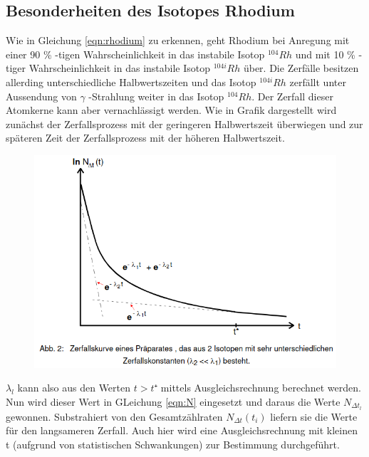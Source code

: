 \subsection{Besonderheiten des Isotopes Rhodium}
    Wie in Gleichung \ref{eqn:rhodium} zu erkennen, geht Rhodium bei Anregung mit einer 90 \% -tigen
    Wahrscheinlichkeit in das instabile Isotop $^{104}Rh$ und mit 10 \% -tiger Wahrscheinlichkeit 
    in das instabile Isotop $^{104i}Rh$ über. Die Zerfälle besitzen allerding unterschiedliche 
    Halbwertszeiten und das Isotop $^{104i}Rh$ zerfällt unter Aussendung von $\gamma$ -Strahlung 
    weiter in das Isotop $^{104}Rh$. Der Zerfall dieser Atomkerne kann aber vernachlässigt werden.
    Wie in Grafik dargestellt wird zunächst der Zerfallsprozess mit der geringeren Halbwertszeit
    überwiegen und zur späteren Zeit der Zerfallsprozess mit der höheren Halbwertszeit. 
    \begin{figure}[H]
        \centering
        \includegraphics{Kurve.png}
        \label{fig:plot}
    \end{figure}
    $\lambda_l$ kann also aus den Werten $t > t⁺$ mittels Ausgleichsrechnung berechnet werden. 
    Nun wird dieser Wert in GLeichung \ref{eqn:N} eingesetzt und daraus die Werte $N_{\Delta t_l}$
    gewonnen. Substrahiert von den Gesamtzählraten $N_{\Delta t}(t_i)$ liefern sie die Werte für den 
    langsameren Zerfall. Auch hier wird eine Ausgleichsrechnung mit kleinen t (aufgrund von 
    statistischen Schwankungen) zur Bestimmung durchgeführt. 
    
